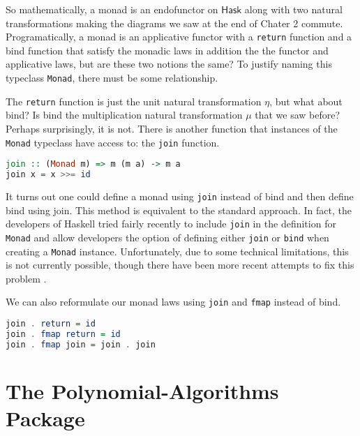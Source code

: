 \documentclass[MS, xcolor=dvipsnames]{wfuthesis}
\def\Hask{\mathsf{Hask}}
\theoremstyle{definition}
\begin{document}
So mathematically, a monad is an endofunctor on $\Hask$ along with two natural transformations making the diagrams we saw at the end of Chater 2 commute. Programatically, a monad is an applicative functor with a \lstinline{return} function and a bind function that satisfy the monadic laws in addition the the functor and applicative laws, but are these two notions the same? To justify naming this typeclass \lstinline{Monad}, there must be some relationship. \par 
The \lstinline{return} function is just the unit natural transformation $\eta$, but what about bind? Is bind the multiplication natural transformation $\mu$ that we saw before? Perhaps surprisingly, it is not. There is another function that instances of the \lstinline{Monad} typeclass have access to: the \lstinline{join} function. 
\begin{lstlisting}[language=Haskell]
join :: (Monad m) => m (m a) -> m a
join x = x >>= id
\end{lstlisting}
It turns out one could define a monad using \lstinline{join} instead of bind and then define bind using join. This method is equivalent to the standard approach. In fact, the developers of Haskell tried fairly recently to include \lstinline{join} in the definition for \lstinline{Monad} and allow developers the option of defining either \lstinline{join} or \lstinline{bind} when creating a \lstinline{Monad} instance. Unfortunately, due to some technical limitations, this is not currently possible, though there have been more recent attempts to fix this problem \cite{Scott2018}. \par 
We can also reformulate our monad laws using \lstinline{join} and \lstinline{fmap} instead of bind. 
\begin{lstlisting}[language=Haskell]
join . return = id
join . fmap return = id
join . fmap join = join . join
\end{lstlisting}


\chapter{The Polynomial-Algorithms Package}
\end{document}
